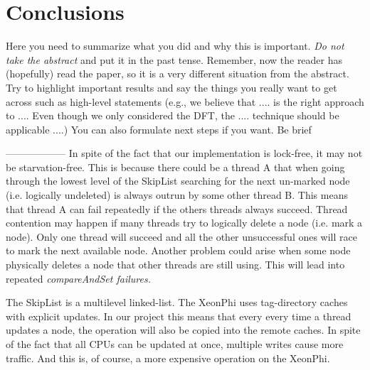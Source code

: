\section{Conclusions}

Here you need to summarize what you did and why this is
important. {\em Do not take the abstract} and put it in the past
tense. Remember, now the reader has (hopefully) read the paper, so it
is a very different situation from the abstract. Try to highlight
important results and say the things you really want to get across
such as high-level statements (e.g., we believe that .... is the right
approach to .... Even though we only considered the DFT, the
.... technique should be applicable ....) You can also formulate next
steps if you want. Be brief


------------------
In spite of the fact that our implementation is lock-free, it may not be starvation-free. 
This is because there could be a thread A that when going through the lowest level 
of the SkipList searching for the next un-marked node (i.e. logically undeleted) is always 
outrun by some other thread B. This means that thread A can fail repeatedly if the others
threads always succeed.
Thread contention may happen if many threads try to logically delete a node (i.e. mark
a node). Only one thread will succeed and all the other unsuccessful ones will race to mark 
the next available node. Another problem could arise when some node physically deletes a
node that other threads are still using. This will lead into repeated \it{compareAndSet} failures.

The SkipList is a multilevel linked-list. The XeonPhi uses tag-directory caches with explicit updates. 
In our project this means that every every time a thread updates a node, the operation will also be copied 
into the remote caches. In spite of the fact that all CPUs can be updated at once, multiple writes
cause more traffic. And this is, of course, a more expensive operation on the XeonPhi.
